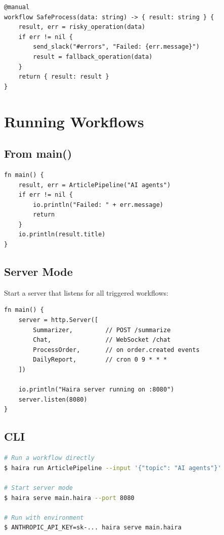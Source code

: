\begin{lstlisting}
@manual
workflow SafeProcess(data: string) -> { result: string } {
    result, err = risky_operation(data)
    if err != nil {
        send_slack("#errors", "Failed: {err.message}")
        result = fallback_operation(data)
    }
    return { result: result }
}
\end{lstlisting}

\section{Running Workflows}

\subsection{From main()}

\begin{lstlisting}
fn main() {
    result, err = ArticlePipeline("AI agents")
    if err != nil {
        io.println("Failed: " + err.message)
        return
    }
    io.println(result.title)
}
\end{lstlisting}

\subsection{Server Mode}

Start a server that listens for all triggered workflows:

\begin{lstlisting}
fn main() {
    server = http.Server([
        Summarizer,         // POST /summarize
        Chat,               // WebSocket /chat
        ProcessOrder,       // on order.created events
        DailyReport,        // cron 0 9 * * *
    ])

    io.println("Haira server running on :8080")
    server.listen(8080)
}
\end{lstlisting}

\subsection{CLI}

\begin{lstlisting}[language=bash,numbers=none]
# Run a workflow directly
$ haira run ArticlePipeline --input '{"topic": "AI agents"}'

# Start server mode
$ haira serve main.haira --port 8080

# Run with environment
$ ANTHROPIC_API_KEY=sk-... haira serve main.haira
\end{lstlisting}

